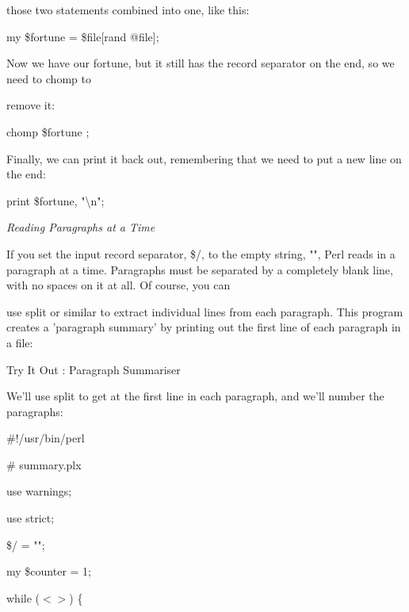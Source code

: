 \documentclass[a4paper,11pt]{book}
\begin{document}
\noindent those two statements combined into one, like this:

\noindent 

\noindent 

\noindent my \$fortune = \$file[rand @file];

\noindent 

\noindent 

\noindent Now we have our fortune, but it still has the record separator on the end, so we need to chomp to

\noindent remove it:

\noindent 

\noindent chomp \$fortune ;

\noindent 

\noindent Finally, we can print it back out, remembering that we need to put a new line on the end:

\noindent 

\noindent print \$fortune, "\textbackslash n";

\noindent 

\noindent \textit{Reading Paragraphs at a Time}

\noindent If you set the input record separator, \$/, to the empty string, "", Perl reads in a paragraph at a time. Paragraphs must be separated by a completely blank line, with no spaces on it at all. Of course, you can

\noindent use split or similar to extract individual lines from each paragraph. This program creates a 'paragraph summary' by printing out the first line of each paragraph in a file:

\noindent 

\noindent Try It Out : Paragraph Summariser

\noindent 

\noindent We'll use split to get at the first line in each paragraph, and we'll number the paragraphs:

\noindent 

\noindent \#!/usr/bin/perl

\noindent \# summary.plx

\noindent use warnings;

\noindent use strict;

\noindent 

\noindent \$/ = "";

\noindent my \$counter = 1;

\noindent 

\noindent while ($<$$>$) \{
\end{document}
